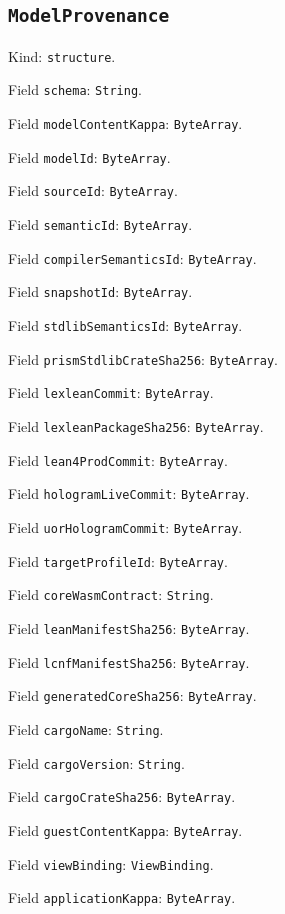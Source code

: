 \documentclass[11pt]{article}
\begin{document}
\subsection*{\texttt{ModelProvenance}}
\noindent Kind: \texttt{structure}.\par
\noindent Field \texttt{schema}: \texttt{String}.\par
\noindent Field \texttt{modelContentKappa}: \texttt{ByteArray}.\par
\noindent Field \texttt{modelId}: \texttt{ByteArray}.\par
\noindent Field \texttt{sourceId}: \texttt{ByteArray}.\par
\noindent Field \texttt{semanticId}: \texttt{ByteArray}.\par
\noindent Field \texttt{compilerSemanticsId}: \texttt{ByteArray}.\par
\noindent Field \texttt{snapshotId}: \texttt{ByteArray}.\par
\noindent Field \texttt{stdlibSemanticsId}: \texttt{ByteArray}.\par
\noindent Field \texttt{prismStdlibCrateSha256}: \texttt{ByteArray}.\par
\noindent Field \texttt{lexleanCommit}: \texttt{ByteArray}.\par
\noindent Field \texttt{lexleanPackageSha256}: \texttt{ByteArray}.\par
\noindent Field \texttt{lean4ProdCommit}: \texttt{ByteArray}.\par
\noindent Field \texttt{hologramLiveCommit}: \texttt{ByteArray}.\par
\noindent Field \texttt{uorHologramCommit}: \texttt{ByteArray}.\par
\noindent Field \texttt{targetProfileId}: \texttt{ByteArray}.\par
\noindent Field \texttt{coreWasmContract}: \texttt{String}.\par
\noindent Field \texttt{leanManifestSha256}: \texttt{ByteArray}.\par
\noindent Field \texttt{lcnfManifestSha256}: \texttt{ByteArray}.\par
\noindent Field \texttt{generatedCoreSha256}: \texttt{ByteArray}.\par
\noindent Field \texttt{cargoName}: \texttt{String}.\par
\noindent Field \texttt{cargoVersion}: \texttt{String}.\par
\noindent Field \texttt{cargoCrateSha256}: \texttt{ByteArray}.\par
\noindent Field \texttt{guestContentKappa}: \texttt{ByteArray}.\par
\noindent Field \texttt{viewBinding}: \texttt{ViewBinding}.\par
\noindent Field \texttt{applicationKappa}: \texttt{ByteArray}.\par
\end{document}
